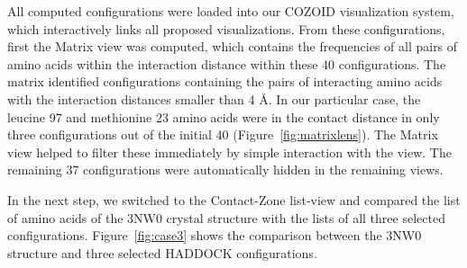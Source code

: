 \documentclass{bmcart}
\def\MatView {Matrix view\xspace}
\def\CoZoListView {Contact-Zone list-view\xspace}
\begin{document}
All computed configurations were loaded into our COZOID visualization system, which interactively links all proposed visualizations.
From these configurations, first the \MatView was computed, which contains the frequencies of all pairs of amino acids within the interaction distance within these 40 configurations.
The matrix identified configurations containing the pairs of interacting amino acids with the interaction distances smaller than 4 \AA.
In our particular case, the leucine 97 and methionine 23 amino acids were in the contact distance in only three configurations out of the initial 40 (Figure~\ref{fig:matrixlens}). 
The Matrix view helped to filter these immediately by simple interaction with the view. 
The remaining 37 configurations were automatically hidden in the remaining views.


In the next step, we switched to the \CoZoListView and compared the list of amino acids of the 3NW0 crystal structure with the lists of all three selected configurations.
Figure~\ref{fig:case3} shows the comparison between the 3NW0 structure and three selected HADDOCK configurations.
\end{document}
